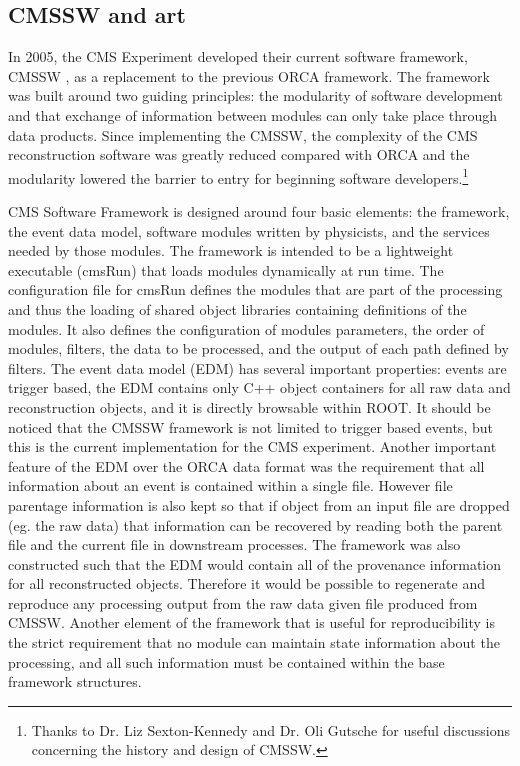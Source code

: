 \subsection{CMSSW and art}

In 2005, the CMS Experiment developed their current software framework, CMSSW \cite{cmssw}, as a replacement to the previous ORCA framework. The framework was built around two guiding principles: the modularity of software development and that exchange of information between modules can only take place through data products. Since implementing the CMSSW, the complexity of the CMS reconstruction software was greatly reduced compared with ORCA and the modularity lowered the barrier to entry for beginning software developers.\footnote{Thanks to Dr. Liz Sexton-Kennedy and Dr. Oli Gutsche for useful discussions concerning the history and design of CMSSW.}

CMS Software Framework is designed around four basic elements: the framework, the event data model, software modules written by physicists, and the services needed by those modules\cite{cmssw_web}. The framework is intended to be a lightweight executable (cmsRun) that loads modules dynamically at run time. The configuration file for cmsRun defines the modules that are part of the processing and thus the loading of shared object libraries containing definitions of the modules. It also defines the configuration of modules parameters, the order of modules, filters, the data to be processed, and the output of each path defined by filters. The event data model (EDM) has several important properties: events are trigger based, the EDM contains only C++ object containers for all raw data and reconstruction objects, and it is directly browsable within ROOT. It should be noticed that the CMSSW framework is not limited to trigger based events, but this is the current implementation for the CMS experiment. Another important feature of the EDM over the ORCA data format was the requirement that all information about an event is contained within a single file. However file parentage information is also kept so that if object from an input file are dropped (eg. the raw data) that information can be recovered by reading both the parent file and the current file in downstream processes. The framework was also constructed such that the EDM would contain all of the provenance information for all reconstructed objects. Therefore it would be possible to regenerate and reproduce any processing output from the raw data given file produced from CMSSW. Another element of the framework that is useful for reproducibility is the strict requirement that no module can maintain state information about the processing, and all such information must be contained within the base framework structures.

